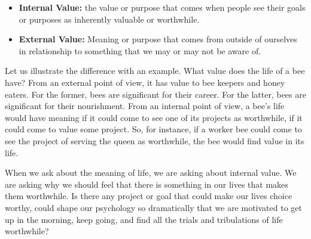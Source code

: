 \documentclass[]{article}
\begin{document}
\begin{itemize}
\item
  \textbf{Internal Value:} the value or purpose that comes when people
  see their goals or purposes as inherently valuable or worthwhile.
\item
  \textbf{External Value:} Meaning or purpose that comes from outside of
  ourselves in relationship to something that we may or may not be aware
  of.
\end{itemize}

Let us illustrate the difference with an example. What value does the
life of a bee have? From an external point of view, it has value to bee
keepers and honey eaters. For the former, bees are significant for their
career. For the latter, bees are significant for their nourishment. From
an internal point of view, a bee's life would have meaning if it could
come to see one of its projects as worthwhile, if it could come to value
some project. So, for instance, if a worker bee could come to see the
project of serving the queen as worthwhile, the bee would find value in
its life.

When we ask about the meaning of life, we are asking about internal
value. We are asking why we should feel that there is something in our
lives that makes them worthwhile. Is there any project or goal that
could make our lives choice worthy, could shape our psychology so
dramatically that we are motivated to get up in the morning, keep going,
and find all the trials and tribulations of life worthwhile?
\end{document}
